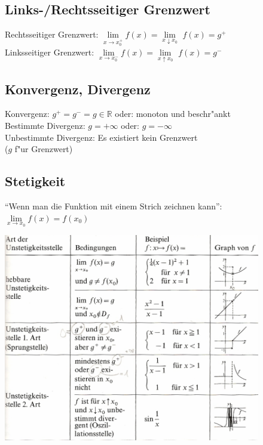 	\begin{figure}[ht]
		\begin{minipage}[b]{10.4 cm}
			\subsection{Links-/Rechtsseitiger Grenzwert}
				Rechtsseitiger Grenzwert: $\lim\limits_{x \to x_0^+} f(x) = \lim\limits_{x \downarrow x_0}$
				$f(x) = g^+$\\
				Linksseitiger Grenzwert: $\lim\limits_{x \to x_0^-} f(x) = \lim\limits_{x \uparrow x_0}$
				$f(x) = g^-$

			\subsection{Konvergenz, Divergenz}
				Konvergenz: $g^+ = g^- = g \in \mathbb{R}$ oder: monoton und beschr"ankt\\
				Bestimmte Divergenz: $g = +\infty$ oder: $g = -\infty$\\ 
				Unbestimmte Divergenz: Es existiert kein Grenzwert\\
				\small{($g$ f"ur Grenzwert)}

			\subsection{Stetigkeit}
				"`Wenn man die Funktion mit einem Strich zeichnen kann"':\\
				$\lim\limits_{x \to x_0} f(x) = f(x_0)$
  		\end{minipage}
  		\begin{minipage}[b]{8 cm}
    		\includegraphics[width=8 cm]{./bilder/grenzwerte_unstetigkeitsstellen.png}
  		\end{minipage}
	\end{figure}
	
